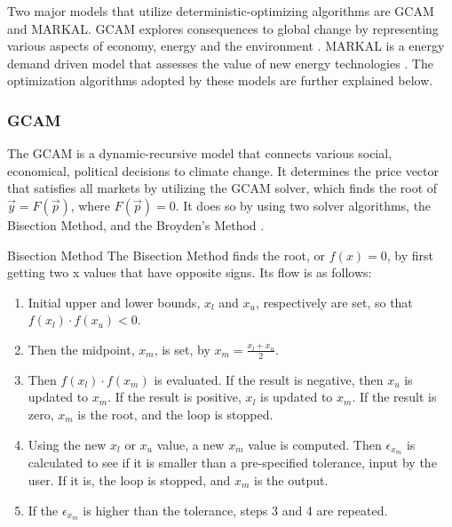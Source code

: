 Two major models that utilize deterministic-optimizing algorithms are
\gls{GCAM} and \gls{MARKAL}. \gls{GCAM} explores consequences to global
change by representing various aspects of economy, energy and the environment \cite{advanced_1994}.
\gls{MARKAL} is a energy demand driven model that assesses the value of new
energy technologies \cite{Markal_1981}. The optimization algorithms adopted
by these models are further explained below.

\subsubsection{ \gls{GCAM}}
The \gls{GCAM} is a dynamic-recursive model that connects various
social, economical, political decisions to climate change. 
It determines the price vector that satisfies all markets by
utilizing the GCAM solver, which finds the root of $\vec{y} = F(\vec{p})$,
where $F(\vec{p})=0$. It does so by using two solver algorithms, the Bisection Method,
and the Broyden's Method \cite{GCAM_solver}. 

Bisection Method
The Bisection Method finds the root, or $f(x)=0$, by first
getting two x values that have opposite signs. Its flow is as follows:

\begin{enumerate}
	\item Initial upper and lower bounds, $x_l$ and $x_u$, respectively are set,
	so that $f(x_l) \cdot f(x_u) <0 $.
	\item Then the midpoint, $x_m$, is set, by $x_m = \frac{x_l+x_u}{2}$.
	\item Then $f(x_l) \cdot f(x_m)$ is evaluated. If the result is negative,
	then $x_u$ is updated to $x_m$. If the result is positive, $x_l$ is updated
	to $x_m$. If the result is zero, $x_m$ is the root, and the loop is stopped.
	\item Using the new $x_l$ or $x_u$ value, a new $x_m$ value is computed. Then
	$\epsilon_{x_m}$ is calculated to see if it is smaller than a pre-specified tolerance,
	input by the user. If it is, the loop is stopped, and $x_m$ is the output.
	\item If the $\epsilon_{x_m}$ is higher than the tolerance, steps 3 and 4 are repeated.
\end{enumerate}


